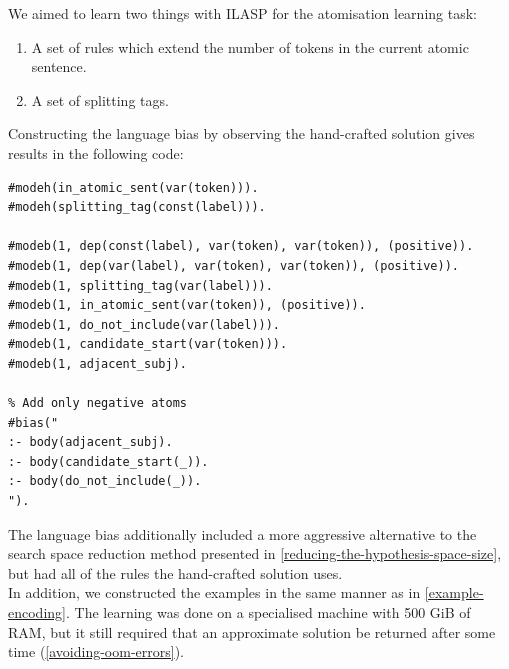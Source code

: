 We aimed to learn two things with ILASP for the atomisation learning task:
\begin{enumerate}
    \item A set of rules which extend the number of tokens in the current atomic sentence.
    \item A set of splitting tags.
\end{enumerate}

Constructing the language bias by observing the hand-crafted solution gives results in the following code:
\begin{verbatim}
#modeh(in_atomic_sent(var(token))).
#modeh(splitting_tag(const(label))).

#modeb(1, dep(const(label), var(token), var(token)), (positive)).
#modeb(1, dep(var(label), var(token), var(token)), (positive)).
#modeb(1, splitting_tag(var(label))).
#modeb(1, in_atomic_sent(var(token)), (positive)).
#modeb(1, do_not_include(var(label))).
#modeb(1, candidate_start(var(token))). 
#modeb(1, adjacent_subj).

% Add only negative atoms
#bias("
:- body(adjacent_subj).
:- body(candidate_start(_)).
:- body(do_not_include(_)).
").
\end{verbatim}

The language bias additionally included a more aggressive alternative to the search space reduction method presented in \ref{reducing-the-hypothesis-space-size}, but had all of the rules the hand-crafted solution uses. \\
In addition, we constructed the examples in the same manner as in \ref{example-encoding}.
The learning was done on a specialised machine with 500 GiB of RAM, but it still required that an approximate solution be returned after some time (\ref{avoiding-oom-errors}).


